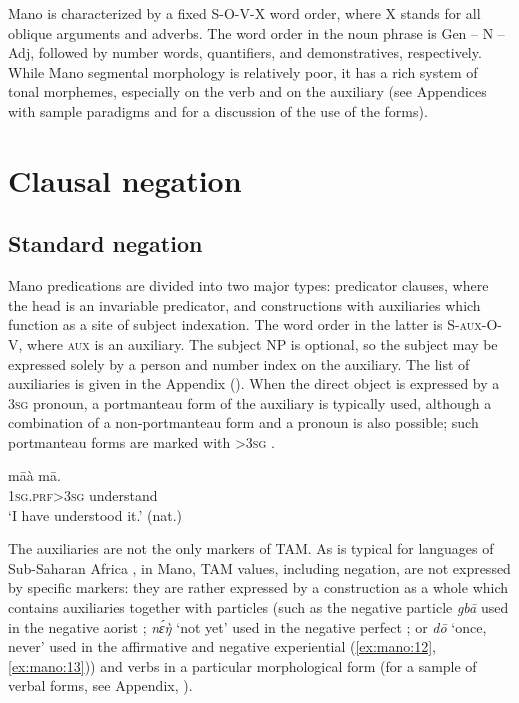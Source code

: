 \documentclass[output=paper,colorlinks,citecolor=brown]{langscibook}
\begin{document}
Mano is characterized by a fixed S-O-V-X word order, where X stands for all oblique arguments and adverbs. The word order in the noun phrase is Gen – N – Adj, followed by number words, quantifiers, and demonstratives, respectively. 
While Mano segmental morphology is relatively poor, it has a rich system of tonal morphemes, especially on the verb and on the auxiliary (see Appendices with sample paradigms and  for a discussion of the use of the forms).

\section{Clausal negation}\label{sec:mano:2}
\subsection{Standard negation}\label{sec:mano:2.1}

Mano predications are divided into two major types: predicator clauses, where the head is an invariable predicator, and constructions with auxiliaries which function as a site of subject indexation. The word order in the latter is \textsc{S-aux-O-V,} where \textsc{aux} is an auxiliary. 
The subject NP is optional, so the subject may be expressed solely by a person and number index on the auxiliary. The list of auxiliaries is given in the Appendix (). When the direct object is expressed by a \textsc{3sg} pronoun, a portmanteau form of the auxiliary is typically used, although a combination of a non-portmanteau form and a pronoun is also possible; such portmanteau forms are marked with >3\textsc{sg} .

\ea\label{ex:mano:1}
    \gll  māà mā.   \\
     \textsc{1sg.prf>3sg} understand   \\
    \glt ‘I have understood it.’ (nat.)
\z

The auxiliaries are not the only markers of TAM.
As is typical for languages of Sub-Saharan Africa \citep[343]{Welmers1973}, in Mano, TAM values, including negation, are not expressed by specific markers: they are rather expressed by a construction as a whole which contains auxiliaries together with particles (such as the negative particle \textit{gbā} used in the negative aorist ; \textit{nɛ́ŋ̀ } ‘not yet’ used in the negative perfect ; or \textit{dō} ‘once, never’ used in the affirmative and negative experiential (\ref{ex:mano:12}, \ref{ex:mano:13})) and verbs in a particular morphological form (for a sample of verbal forms, see Appendix, ).
\end{document}
